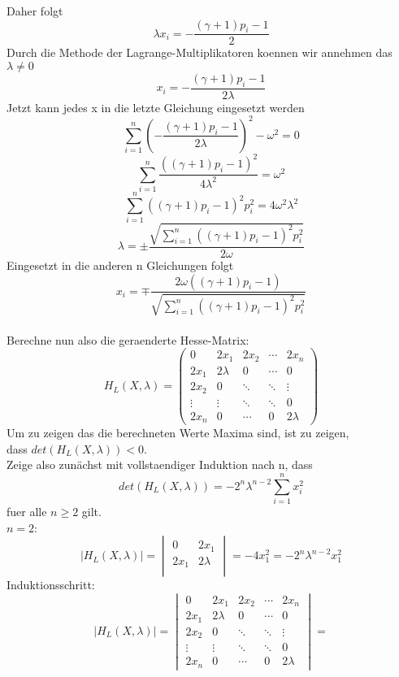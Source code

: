 \documentclass[11pt]{scrartcl}
\begin{document}
			Daher folgt
			\[\lambda x_{i} = -\frac{(\gamma +1)p_{i}-1}{2}\]
			Durch die Methode der Lagrange-Multiplikatoren koennen wir annehmen das \(\lambda \neq 0\)
			\[x_{i}= -\frac{(\gamma +1)p_{i}-1}{2\lambda}\]
			Jetzt kann jedes x in die letzte Gleichung eingesetzt werden
			\[\sum_{i=1}^{n}(-\frac{(\gamma +1)p_{i}-1}{2\lambda})^2-\omega^2=0\]
			\[\sum_{i=1}^{n}\frac{((\gamma +1)p_{i}-1)^2}{4\lambda^2}=\omega^2\]
			\[\sum_{i=1}^{n}((\gamma +1)p_{i}-1)^2p_{i}^2=4\omega^2\lambda^2\]
			\[\lambda = \pm\frac{\sqrt{\sum_{i=1}^{n}((\gamma +1)p_{i}-1)^2p_{i}^2}}{2\omega}\]
			Eingesetzt in die anderen n Gleichungen folgt
			\[x_{i}=\mp\frac{2\omega((\gamma +1)p_{i}-1)}{\sqrt{\sum_{i=1}^{n}((\gamma +1)p_{i}-1)^2p_{i}^2}}\]\\
			Berechne nun also die geraenderte Hesse-Matrix:
			$$
			H_{L}(X,\lambda)=
			\left(
			\begin{array}{ccccc}
				0 & 2x_{1} & 2x_{2} & \cdots & 2x_{n} \\
				2x_{1} & 2\lambda & 0 & \cdots & 0 \\
				2x_{2} & 0 & \ddots & \ddots & \vdots \\
				\vdots & \vdots & \ddots & \ddots & 0 \\
				2x_{n} &  0 & \cdots & 0 & 2\lambda
			\end{array}
			\right)
			$$
			Um zu zeigen das die berechneten Werte Maxima sind, ist zu zeigen,\\ dass \(det(H_{L}(X,\lambda))<0\).\\
			Zeige also zunächst mit vollstaendiger Induktion nach n, dass
			$$
			det(H_{L}(X,\lambda))=-2^n\lambda^{n-2}\sum_{i=1}^{n}x_{i}^2
			$$
			fuer alle \(n\geq2\) gilt.\\
			\(n=2\):
			$$
			|H_{L}(X,\lambda)|=
			\begin{vmatrix}
				0 & 2x_{1} \\
				2x_{1} & 2\lambda\\
			\end{vmatrix}
			=-4x_{1}^2=-2^n\lambda^{n-2}x_{1}^2
			$$
			Induktionsschritt:
			$$
			|H_{L}(X,\lambda)|=
			\begin{vmatrix}
				0 & 2x_{1} & 2x_{2} & \cdots & 2x_{n} \\
				2x_{1} & 2\lambda & 0 & \cdots & 0 \\
				2x_{2} & 0 & \ddots & \ddots & \vdots \\
				\vdots & \vdots & \ddots & \ddots & 0 \\
				2x_{n} &  0 & \cdots & 0 & 2\lambda
			\end{vmatrix}
			=
			$$
\end{document}
